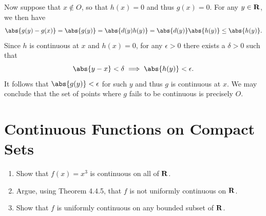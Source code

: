 \documentclass{lew98_solutions}
\begin{document}
\begin{solution}
\begin{enumerate}
        Now suppose that \( x \not\in O \), so that \( h(x) = 0 \) and thus \( g(x) = 0 \). For any \( y \in \mathbf{R} \), we then have
        \[
            \abs{g(y) - g(x)} = \abs{g(y)} = \abs{d(y)h(y)} = \abs{d(y)} \abs{h(y)} \leq \abs{h(y)}.
        \]
        Since \( h \) is continuous at \( x \) and \( h(x) = 0 \), for any \( \epsilon > 0 \) there exists a \( \delta > 0 \) such that
        \[
            \abs{y - x} < \delta \implies \abs{h(y)} < \epsilon.
        \]
        It follows that \( \abs{g(y)} < \epsilon \) for such \( y \) and thus \( g \) is continuous at \( x \). We may conclude that the set of points where \( g \) fails to be continuous is precisely \( O \).
    \end{enumerate}
\end{solution}

\section{Continuous Functions on Compact Sets}
\label{sec:4.4}

\begin{exercise}
\label{ex:4.4.1}
    \begin{enumerate}
        \item Show that \( f(x) = x^3 \) is continuous on all of \( \mathbf{R} \).

        \item Argue, using Theorem 4.4.5, that \( f \) is not uniformly continuous on \( \mathbf{R} \).

        \item Show that \( f \) is uniformly continuous on any bounded subset of \( \mathbf{R} \).
    \end{enumerate}
\end{exercise}
\end{document}
